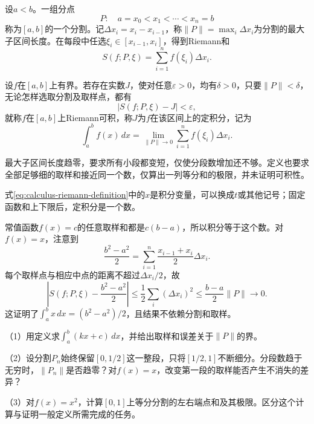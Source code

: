 \begin{definition}
设\(a<b\)。一组分点
\begin{equation*}
 P:\quad a=x_0<x_1<\cdots<x_n=b
\end{equation*}
称为\([a,b]\)的一个{\heiti{}分割}。记\(\Delta x_i=x_i-x_{i-1}\)，称\(\|P\|=\max_i\Delta x_i\)为分割的{\heiti{}最大子区间长度}。在每段中任选\(\xi_i\in[x_{i-1},x_i]\)，得到{\heiti{}Riemann和}
\begin{equation*}
 S(f;P,\xi)=\sum_{i=1}^n f(\xi_i)\Delta x_i.
\end{equation*}
\end{definition}

\begin{definition}
设\(f\)在\([a,b]\)上有界。若存在实数\(J\)，使对任意\(\varepsilon>0\)，均有\(\delta>0\)，只要\(\|P\|<\delta\)，无论怎样选取分割及取样点，都有
\begin{equation*}
 |S(f;P,\xi)-J|<\varepsilon,
\end{equation*}
就称\(f\)在\([a,b]\)上{\heiti{}Riemann可积}，称\(J\)为\(f\)在该区间上的{\heiti{}定积分}，记为
\begin{equation}\label{eq:calculus-riemann-definition}
 \int_a^b f(x)\,dx=\lim_{\|P\|\to0}\sum_{i=1}^n f(\xi_i)\Delta x_i.
\end{equation}
\end{definition}

最大子区间长度趋零，要求所有小段都变短，仅使分段数增加还不够。定义也要求全部足够细的取样和接近同一个数，仅算出一列等分和的极限，并未证明可积性。

式\eqref{eq:calculus-riemann-definition}中的\(x\)是积分变量，可以换成\(t\)或其他记号；固定函数和上下限后，定积分是一个数。

常值函数\(f(x)=c\)的任意取样和都是\(c(b-a)\)，所以积分等于这个数。对\(f(x)=x\)，注意到
\begin{equation*}
 \frac{b^2-a^2}{2}=\sum_{i=1}^n\frac{x_{i-1}+x_i}{2}\Delta x_i.
\end{equation*}
每个取样点与相应中点的距离不超过\(\Delta x_i/2\)，故
\begin{equation*}
 \left|S(f;P,\xi)-\frac{b^2-a^2}{2}\right|
 \le\frac12\sum_i(\Delta x_i)^2
 \le\frac{b-a}{2}\|P\|\longrightarrow0.
\end{equation*}
这证明了\(\int_a^b x\,dx=(b^2-a^2)/2\)，且结果不依赖分割和取样。

\begin{exercise}
\mbox{}\par\nobreak

（1）用定义求\(\int_a^b(kx+c)\,dx\)，并给出取样和误差关于\(\|P\|\)的界。

（2）设分割\(P_n\)始终保留\([0,1/2]\)这一整段，只将\([1/2,1]\)不断细分。分段数趋于无穷时，\(\|P_n\|\)是否趋零？对\(f(x)=x\)，改变第一段的取样能否产生不消失的差异？

（3）对\(f(x)=x^2\)，计算\([0,1]\)上等分分割的左右端点和及其极限。区分这个计算与证明一般定义所需完成的任务。
\end{exercise}

